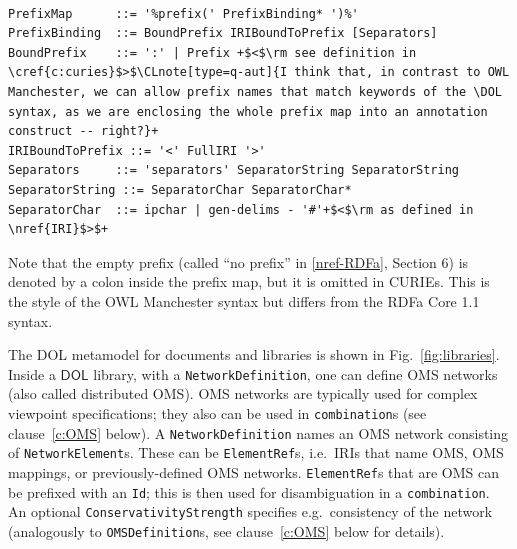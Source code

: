 \documentclass[10pt, a4paper]{isov2}
\makeatletter
\newcommand*\CommentAuthor{}
\renewcommand*\CommentAuthor{#1}}
\newcommand*\CommentDate{}
\renewcommand*\CommentDate{#1}}
\newcommand*\CommentId{}
\renewcommand*\CommentId{#1}}
\newcommand*\CommentType{}
\renewcommand*\CommentType{#1}}
\newcommand*{\SetCommentColorByType}[1]{%
\edef\localType{{#1}}%
\expandafter\ifstrequal\localType{q-aut}{\colorlet{CommentColor}{red}}{%
\expandafter\ifstrequal\localType{q-all}{\colorlet{CommentColor}{orange}}{%
\expandafter\ifstrequal\localType{todo}{\colorlet{CommentColor}{orange}}{%
\expandafter\ifstrequal\localType{fyi}{\colorlet{CommentColor}{lightgray}}{%
\colorlet{CommentColor}{yellow}}}}}}
\newcommand*{\SetCommentPrefixByType}[1]{%
\edef\localType{{#1}}%
\expandafter\@ifmtarg\localType{%
\edef\CommentPrefix{}%
}{%
\caseupper[q]{#1}%
\edef\CommentPrefix{\thestring: }%
}}
\newcommand*{\initComment}[1]{%
\setkeys{Comment}{#1}%
\SetCommentColorByType{\CommentType}%
\relax%
\SetCommentPrefixByType{\CommentType}%
\relax%
}
\newcommand*{\todonote}[2][]{%
\initComment{#1}%
\pdfcomment[author=\CommentAuthor,color=CommentColor,date=\CommentDate,id=\CommentId]{%
\CommentPrefix
#2}}
\renewcommand*{\todonote}[2][]{%
\initComment{#1}%
\ednote{\CommentPrefix #2}}
\newcommand*{\CLnote}[2][author=Christoph Lange]{%
\todonote[author=Christoph Lange,#1]{#2}}
\newcommand*{\syntax}[1]{\texttt{#1}}
\newcommand*{\DOL}{\ensuremath{\mathsf{DOL}}\xspace}
\renewcommand{\clauserefname}{clause}
\renewcommand{\noterefname}{note}
\renewcommand{\cref}[1]{\clauserefname~\ref{#1}}
\renewcommand{\nref}[1]{\noterefname~\ref{#1}}
\renewcommand{\nref}[1]{\ref{nref-#1}}
\makeatother
\begin{document}
\begin{lstlisting}[language=ebnf,escapechar=+,morecomment={[l]{\%\%\ }}]

PrefixMap      ::= '%prefix(' PrefixBinding* ')%'
PrefixBinding  ::= BoundPrefix IRIBoundToPrefix [Separators]
BoundPrefix    ::= ':' | Prefix +$<$\rm see definition in \cref{c:curies}$>$\CLnote[type=q-aut]{I think that, in contrast to OWL Manchester, we can allow prefix names that match keywords of the \DOL syntax, as we are enclosing the whole prefix map into an annotation construct -- right?}+
IRIBoundToPrefix ::= '<' FullIRI '>'
Separators     ::= 'separators' SeparatorString SeparatorString
SeparatorString ::= SeparatorChar SeparatorChar*
SeparatorChar  ::= ipchar | gen-delims - '#'+$<$\rm as defined in \nref{IRI}$>$+
\end{lstlisting}


 Note that the empty prefix (called ``no prefix'' in \nref{RDFa}, Section 6) is denoted by a colon inside the prefix map, but it is omitted in CURIEs.  This is the style of the OWL Manchester syntax \cite{W3C:NOTE-owl2-manchester-syntax-20091027} but differs from the RDFa Core 1.1 syntax.

\vspace{1em}
	



\label{c:networks}


The DOL metamodel for documents and libraries is shown in Fig.~\ref{fig:libraries}.
Inside a \DOL library, with a \syntax{NetworkDefinition}, one can
define OMS networks (also called distributed OMS). OMS networks are
typically used for complex viewpoint specifications; they also can be
used in \syntax{combination}s (see clause~\ref{c:OMS} below). A
\syntax{NetworkDefinition} names an OMS network consisting of
\syntax{NetworkElement}s. These can be \syntax{ElementRef}s,
i.e.\ IRIs that name OMS, OMS mappings, or previously-defined OMS
networks. \syntax{ElementRef}s that are OMS can be prefixed with an
\syntax{Id}; this is then used for disambiguation in a
\syntax{combination}.  An optional \syntax{ConservativityStrength}
specifies e.g.\ consistency of the network (analogously to
\syntax{OMSDefinition}s, see clause~\ref{c:OMS} below for details).
\end{document}
